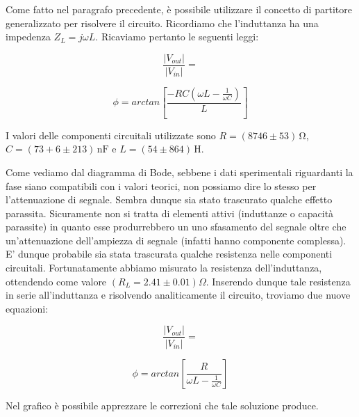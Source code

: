 Come fatto nel paragrafo precedente, è possibile utilizzare il concetto di partitore generalizzato per risolvere il circuito. Ricordiamo che l'induttanza ha una impedenza $Z_L=j\omega L$. Ricaviamo pertanto le seguenti leggi:

\begin{equation}
\frac{|V_{out}|}{|V_{in}|}=
\label{eq:bpfGain}
\end{equation}

\begin{equation}
\phi=arctan\left[\frac{-RC(\omega L-\frac{1}{\omega C})}{L}\right]
\label{eq:bpfPhi}
\end{equation}

\noindent I valori delle componenti circuitali utilizzate sono $R=(8746 \pm 53)\,\si{\ohm}$, $C=(73+6 \pm 213)\,\si{\nano\farad}$ e $L=(54 \pm 864)\,\si{\henry}$.

Come vediamo dal diagramma di Bode, sebbene i dati sperimentali riguardanti la fase siano compatibili con i valori teorici, non possiamo dire lo stesso per l'attenuazione di segnale. Sembra dunque sia stato trascurato qualche effetto parassita. Sicuramente non si tratta di elementi attivi (induttanze o capacità parassite) in quanto esse produrrebbero un uno sfasamento del segnale oltre che un'attenuazione dell'ampiezza di segnale (infatti hanno componente complessa). E' dunque probabile sia stata trascurata qualche resistenza nelle componenti circuitali. Fortunatamente abbiamo misurato la resistenza dell'induttanza, ottendendo come valore $(R_L=2.41\pm 0.01) \Omega$. Inserendo dunque tale resistenza in serie all'induttanza e risolvendo analiticamente il circuito, troviamo due nuove equazioni:\\

\noindent
\begin{minipage}{.5\linewidth}
\begin{equation}
\frac{|V_{out}|}{|V_{in}|}=
\label{bpfGain_corr}
\end{equation}
\end{minipage}%
\begin{minipage}{.5\linewidth}
\begin{equation}
\phi=arctan\left[\frac{R}{\omega L-\frac{1}{\omega C}}\right]
\label{bpfPhi_corr}
\end{equation}
\end{minipage}
\break
\noindent Nel grafico è possibile apprezzare le correzioni che tale soluzione produce.

